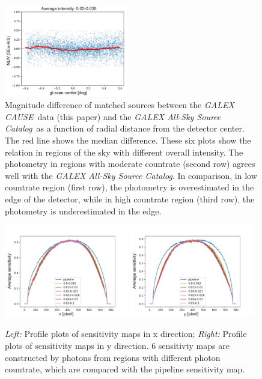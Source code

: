 \documentclass[12pt, preprint]{aastex61}
\newcommand{\project}[1]{\textsl{#1}}
\newcommand{\asc}{\project{GALEX All-Sky Source Catalog}}
\newcommand{\cause}{\project{GALEX CAUSE}}
\begin{document}
\begin{figure}[p]
\begin{center}
\includegraphics[width=0.48\textwidth]{figures/cr6-new}
\end{center}
\caption{
  \label{countrate}
  Magnitude difference of matched sources between the \cause\ data (this paper) and the \asc\ as a function of radial distance from the detector center. 
  The red line shows the median difference.
  These six plots show the relation in regions of the sky with different overall intensity.
  The photometry in regions with moderate countrate (second row) agrees well with the \asc.
  In comparison, in low countrate region (first row), the photometry is overestimated in the edge of the detector, while in high countrate region (third row), the photometry is underestimated in the edge.
}
\end{figure}

\begin{figure}[p]
\begin{center}
\includegraphics[width=0.48\textwidth]{figures/profile_x-new}
\includegraphics[width=0.48\textwidth]{figures/profile_y-new}
\end{center}
\caption{
  \label{flat-profile}
  \emph{Left:} Profile plots of sensitivity maps in x direction;
  \emph{Right:} Profile plots of sensitivity maps in y direction.
  6 sensitivty maps are constructed by photons from regions with different photon countrate, which are compared with the pipeline sensitivity map.
}
\end{figure}
\end{document}
